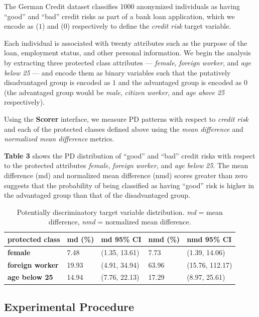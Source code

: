 \documentclass{acm_proc_article-sp}
\begin{document}
The German Credit dataset classifies 1000 anonymized individuals as having
``good'' and ``bad'' credit risks as part of a bank loan application, which we
encode as (\(1\)) and (\(0\)) respectively to define the \emph{credit risk}
target variable.

Each individual is associated with twenty attributes such as the purpose of the
loan, employment status, and other personal information. We begin the analysis
by extracting three protected class attributes --- \emph{female},
\emph{foreign worker}, and \emph{age below 25} --- and encode them as binary
variables such that the putatively disadvantaged group is encoded as \(1\) and
the advantaged group is encoded as \(0\) (the advantaged group would be
\emph{male}, \emph{citizen worker}, and \emph{age above 25} respectively).

Using the \textbf{Scorer} interface, we measure PD patterns with respect to
\emph{credit risk} and each of the protected classes defined above using the
\emph{mean difference} and \emph{normalized mean difference} metrics.

\textbf{Table 3} shows the PD distribution of ``good'' and ``bad'' credit risks
with respect to the protected attributes \emph{female}, \emph{foreign
worker}, and \emph{age below 25}. The mean difference (md) and normalized mean
difference (nmd) scores greater than zero suggests that the probability
of being classified as having ``good'' risk is higher in the advantaged group
than that of the disadvantaged group.

\begin{table}
  \caption{Potentially discriminatory target variable distribution.
    \emph{md} = mean difference, \emph{nmd} = normalized mean difference.}
  \renewcommand{\arraystretch}{1.75}
  \small\noindent\begin{tabularx}{\linewidth}{l|X|X|X|X}
    \textbf{protected class} & \textbf{md (\%)} & \textbf{md 95\% CI} &
      \textbf{nmd (\%)} & \textbf{nmd 95\% CI}\\
    \hline
    \textbf{female} & 7.48 & (1.35, 13.61) & 7.73 & (1.39, 14.06) \\
    \textbf{foreign worker} & 19.93 & (4.91, 34.94) & 63.96 & (15.76, 112.17)\\
    \textbf{age below 25} & 14.94 & (7.76, 22.13) & 17.29 & (8.97, 25.61)\\
  \end{tabularx}
\end{table}

\subsection{Experimental Procedure}
\end{document}

